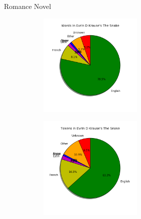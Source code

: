 \documentclass[10pt]{beamer}
\begin{document}
\begin{frame}[fragile]{Romance Novel}

  \begin{figure}
  \centering
  \begin{subfigure}
  \centering
    \includegraphics[width=5cm]{romancewords.png}
  \end{subfigure}
  \begin{subfigure}
  \centering
    \includegraphics[width=5cm]{romancetokens.png}
  \end{subfigure}
  \end{figure}

\end{frame}
\end{document}
